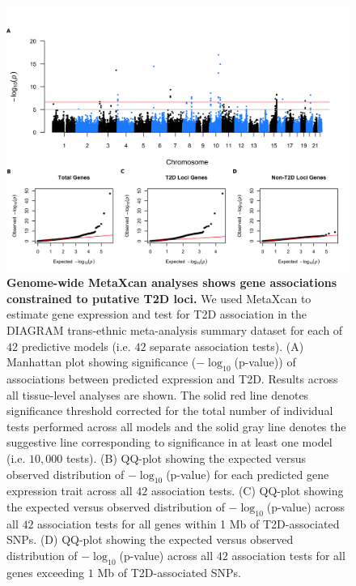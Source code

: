 \documentclass[10pt]{article}
\begin{document}
\begin{figure}
	\includegraphics[width=\textwidth]{fig4_manhat_qqArray.png}
	\caption{\textbf{Genome-wide MetaXcan analyses shows gene associations constrained to putative T2D loci.} We used MetaXcan to estimate gene expression and test for T2D association in the DIAGRAM trans-ethnic meta-analysis summary dataset for each of $42$ predictive models (i.e. $42$ separate association tests). (A) Manhattan plot showing significance ($-\log_{10}$(p-value)) of associations between predicted expression and T2D. Results across all tissue-level analyses are shown. The solid red line denotes significance threshold corrected for the total number of individual tests performed across all models and the solid gray line denotes the suggestive line corresponding to significance in at least one model (i.e. $10,000$ tests). (B) QQ-plot showing the expected versus observed distribution of $-\log_{10}$(p-value) for each predicted gene expression trait across all $42$ association tests. (C) QQ-plot showing the expected versus observed distribution of $-\log_{10}$(p-value) across all $42$ association tests for all genes within 1 Mb of T2D-associated SNPs. (D) QQ-plot showing the expected versus observed distribution of $-\log_{10}$(p-value) across all $42$ association tests for all genes exceeding $1$ Mb of T2D-associated SNPs.}
    \label{fig:manhat_qqarray}
\end{figure}
\end{document}
